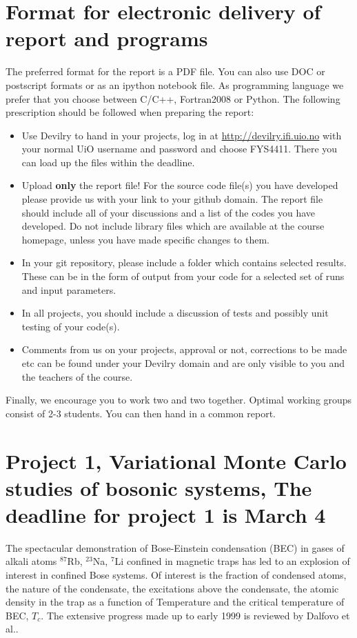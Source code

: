 \documentclass[10pt]{article}
\begin{document}
\section*{Format for electronic delivery of report and programs}
%
The preferred format for the report is a PDF file. You can also
use DOC or postscript formats or as an ipython notebook file. 
As programming language we prefer that you choose between C/C++, Fortran2008 or Python.
The following prescription should be followed when preparing the report:
\begin{itemize}
\item Use Devilry to hand in your projects, log in  at 
\url{ http://devilry.ifi.uio.no} with your normal UiO username and password
and choose FYS4411.
There you can load up the files within the deadline.
\item Upload {\bf only} the report file!  For the source code file(s) you have developed please provide us with your link to your github domain. 
The report file should include all of your discussions and a list of the codes you have developed. 
Do not include library files which are available at the course homepage, unless you have
made specific changes to them.
\item In your git repository, please include a folder which contains selected results. These can be in the form of output from your code
for a selected set of runs and input parameters. 
\item In all projects, you should include a discussion of tests and possibly unit testing of your code(s).
\item Comments  from us on your projects, approval or not, corrections to be made 
etc can be found under
your Devilry domain and are only visible to you and the teachers of the course.

\end{itemize}

Finally, 
we encourage you to work two and two together. Optimal working groups consist of 
2-3 students. You can then hand in a common report. 


\section*{Project 1, Variational Monte Carlo studies of bosonic systems, The deadline for project 1 is March 4}

 The spectacular demonstration of Bose-Einstein condensation (BEC) in gases of
 alkali atoms $^{87}$Rb, $^{23}$Na, $^7$Li confined in magnetic
 traps \cite{anderson95,davis95,bradley95} has led to an explosion of interest in
 confined Bose systems. Of interest is the fraction of condensed atoms, the
 nature of the condensate, the excitations above the condensate, the atomic
 density in the trap as a function of Temperature and the critical temperature of BEC,
 $T_c$. The extensive progress made up to early 1999 is reviewed by Dalfovo et
 al.\cite{dalfovo1999}.
\end{document}
